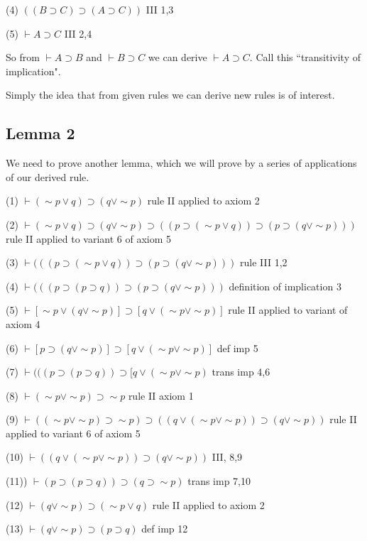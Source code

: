 \documentclass[12pt]{article}
\begin{document}
(4) $((B \supset C) \supset (A \supset C))$  III  1,3

(5)  $\vdash A \supset C$  III 2,4

So from $\vdash A \supset B$ and $\vdash B \supset C$ we can derive $\vdash A \supset C$.  Call this ``transitivity of implication".

Simply the idea that from given rules we can derive new rules is of interest.

\subsection{Lemma 2}

We need to prove another lemma, which we will prove by a series of applications of our derived rule.

(1) $\vdash (\sim p \vee q) \supset (q \vee \sim p)$  rule II applied to axiom 2

(2) $\vdash (\sim p \vee q) \supset (q \vee \sim p) \supset ((p \supset (\sim p \vee q)) \supset (p \supset (q \vee \sim p)))$  rule II applied to variant 6 of axiom 5

(3) $\vdash (((p \supset (\sim p \vee q)) \supset (p \supset (q \vee \sim p)))$  rule III  1,2

(4) $\vdash (((p \supset (p \supset q)) \supset (p \supset (q \vee \sim p)))$ definition of implication 3

(5) $\vdash [\sim p \vee  (q \vee \sim p)] \supset [q \vee (\sim p \vee \sim p)]$ rule II applied to variant of axiom 4

(6) $\vdash [p \supset  (q \vee \sim p)] \supset [q \vee (\sim p \vee \sim p)]$ def imp 5

(7) $\vdash (((p \supset (p \supset q)) \supset [q \vee (\sim p \vee \sim p)$  trans imp 4,6

(8)  $\vdash (\sim p \vee \sim p) \supset \sim p$  rule II axiom 1

(9) $\vdash ((\sim p \vee \sim p) \supset \sim p)\supset ((q \vee (\sim p \vee \sim p)) \supset (q \vee \sim p))$  rule II applied to variant 6 of axiom 5

(10) $\vdash ((q \vee (\sim p \vee \sim p)) \supset (q \vee \sim p))$  III, 8,9

(11)) $\vdash (p \supset (p \supset q) ) \supset (q \supset \sim p)$  trans imp 7,10

(12) $\vdash (q \vee \sim p) \supset (\sim p \vee q)$  rule II applied to axiom 2

(13) $\vdash (q \vee \sim p) \supset (p \supset q)$  def imp 12
\end{document}
